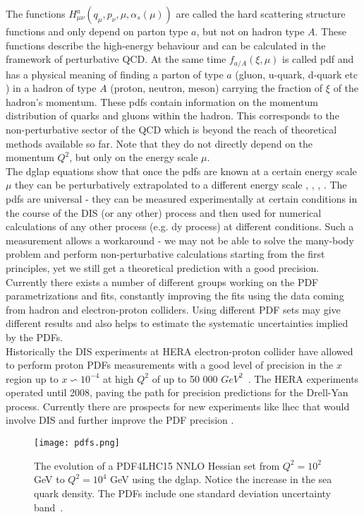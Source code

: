 		The functions $H^a_{\mu\nu}(q_{\mu},p_{\nu},\mu,\alpha_s(\mu))$ are called the hard scattering structure functions and only depend on parton type $a$, but not on hadron type $A$. These functions describe the high-energy behaviour and can be calculated in the framework of perturbative QCD. At the same time $f_{a/A}(\xi,\mu)$ is called \gls{pdf} and has a physical meaning of finding a parton of type $a$ (gluon, u-quark, d-quark etc ) in a hadron of type $A$ (proton, neutron, meson) carrying the fraction of $\xi$ of the hadron's momentum. These \gls{pdf}s contain information on the momentum distribution of quarks and gluons within the hadron. This corresponds to the non-perturbative sector of the QCD which is beyond the reach of theoretical methods available so far. Note that they do not directly depend on the momentum $Q^2$, but only on the energy scale $\mu$. \\
		The \gls{dglap} equations show that once the \gls{pdf}s are known at a certain energy scale $\mu$ they can be perturbatively extrapolated to a different energy scale \cite{Lipatov:1974qm}, \cite{ALTARELLI}, \cite{Gribov:1972ri}, \cite{Dokshitzer:1977sg}. The \gls{pdf}s are universal - they can be measured experimentally at certain conditions in the course of the DIS (or any other) process and then used for numerical calculations of any other process (e.g. \gls{dy} process) at different conditions. Such a measurement allows a workaround - we may not be able to solve the many-body problem and perform non-perturbative calculations starting from the first principles, yet we still get a theoretical prediction with a good precision. Currently there exists a number of different groups working on the PDF parametrizations and fits, constantly improving the fits using the data coming from hadron and electron-proton colliders. Using different PDF sets may give different results and also helps to estimate the systematic uncertainties implied by the PDFs. \\
		Historically the DIS experiments at HERA electron-proton collider have allowed to perform proton PDFs measurements with a good level of precision in the $x$ region up to $x \backsim 10^{-4}$ at high $Q^2$ of up to 50 000 $GeV^2$~\cite{shushin}. The HERA experiments operated until 2008, paving the path for precision predictions for the Drell-Yan process.  Currently there are prospects for new experiments like \gls{lhec} that would involve DIS and further improve the PDF precision \cite{lhec}.
		\begin{figure}[htbp]
		\texttt{[image: pdfs.png]}
		\caption{The evolution of a PDF4LHC15 NNLO Hessian set from $Q^2=10^2$ GeV to $Q^2=10^4$ GeV using the \gls{dglap}. Notice the increase in the sea quark density. The PDFs include one standard deviation uncertainty band~\cite{proton_struct}.}
		\label{fig::pdfs}
		\end{figure}
